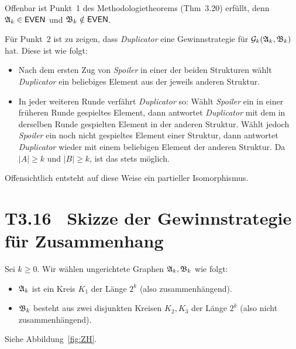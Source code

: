 \documentclass[fontsize=11pt, twoside=false, numbers=autoenddot]{scrbook}
\begin{document}
\begin{beweis}
  Offenbar ist Punkt~1 des Methodologietheorems (Thm~3.20) erfüllt,
  denn $\mathfrak{A}_k \in \textsf{EVEN}$ und $\mathfrak{B}_k \notin \textsf{EVEN}$.

  Für Punkt~2 ist zu zeigen, dass \emph{Duplicator} eine Gewinnstrategie
  für $\mathcal{G}_k(\mathfrak{A}_k,\mathfrak{B}_k)$ hat.
  Diese ist wie folgt:
  \begin{itemize}
    \item
      Nach dem ersten Zug von \emph{Spoiler} in einer der beiden Strukturen
      wählt \emph{Duplicator} ein beliebiges Element aus der jeweils anderen Struktur.
    \item
      In jeder weiteren Runde verfährt \emph{Duplicator} so:
      Wählt \emph{Spoiler} ein in einer früheren Runde gespieltes Element,
      dann antwortet \emph{Duplicator} mit dem in derselben Runde gespielten
      Element in der anderen Struktur.
      Wählt jedoch \emph{Spoiler} ein noch nicht gespieltes Element einer Struktur,
      dann antwortet \emph{Duplicator} wieder mit einem beliebigen Element
      der anderen Struktur.
      Da $|A| \geq k$ und $|B| \geq k$, ist das stets möglich.
  \end{itemize}
  Offensichtlich entsteht auf diese Weise ein partieller Isomorphismus.
  \qedhere
\end{beweis}%

\section*{T3.16~ Skizze der Gewinnstrategie für Zusammenhang}

Sei $k \geq 0$.
Wir w\"ahlen ungerichtete Graphen $\mathfrak{A}_k,\mathfrak{B}_k$ wie folgt:
%
\begin{itemize}
  \item
    $\mathfrak{A}_k$ ist ein Kreis $K_1$ der L\"ange $2^k$ (also zusammenh\"angend).
  \item
    $\mathfrak{B}_k$ besteht aus zwei disjunkten Kreisen $K_2,K_3$ der L\"ange $2^k$
    (also nicht zusammenh\"angend).
\end{itemize}
%
Siehe Abbildung~\ref{fig:ZH}.
\end{document}
